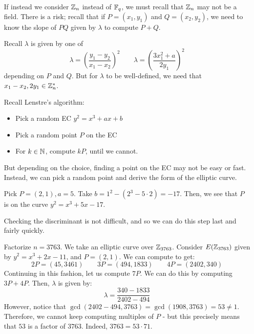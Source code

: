 \documentclass{article}
\begin{document}
If instead we consider $ \mathbb{Z}_{n} $ instead of $ \mathbb{F}_{q} $,
we must recall that $ \mathbb{Z}_{n} $ may not be a field.
There is a risk; recall that if $ P = (x_{1}, y_{1}) $ and $ Q = (x_{2}, y_{2}) $,
we need to know the slope of $ PQ $ given by $ \lambda $ to compute $ P + Q $.

Recall $ \lambda $ is given by one of
\begin{equation*}
    \lambda = \left( \frac{y_{1} - y_{2}}{x_{1} - x_{2}} \right)^{2} \qquad
    \lambda = \left( \frac{3x_{1}^{2}+a}{2y_{1}} \right)^{2}
\end{equation*}
depending on $ P $ and $ Q $.
But for $ \lambda $ to be well-defined, we need that $ x_{1} - x_{2}, 2y_{1} \in \mathbb{Z}_{n}^{*} $.

\newpage
Recall Lenstre's algorithm:
\begin{itemize}
    \item Pick a random EC $ y^{2} = x^{3} + ax + b $
    \item Pick a random point $ P $ on the EC
    \item For $ k \in \mathbb{N} $, compute $ kP $, until we cannot.
\end{itemize}
But depending on the choice, finding a point on the EC may not be easy or fast.
Instead, we can pick a random point and derive the form of the elliptic curve.
\begin{xmp}[source=Primary Source Material]
    Pick $ P = (2, 1), a = 5 $.
    Take $ b = 1^{2} - (2^{3} - 5\cdot2) = -17 $.
    Then, we see that $ P $ is on the curve $ y^{2} = x^{3} + 5x - 17 $.
\end{xmp}
Checking the discriminant is not difficult, and so we can do this step last and fairly quickly.

\begin{xmp}[source=Primary Source Material]
    Factorize $ n = 3763 $. \vsp
    We take an elliptic curve over $ \mathbb{Z}_{3763} $.
    Consider $ E(\mathbb{Z}_{3763}) $ given by $ y^{2} = x^{3} + 2x - 11 $, and $ P = (2, 1) $.
    We can compute to get:
    \begin{equation*}
        2P = (45, 3461) \qquad 3P = (494, 1833) \qquad 4P = (2402, 340)
    \end{equation*}
    Continuing in this fashion, let us compute $ 7P $. We can do this by computing $ 3P + 4P $.
    Then, $ \lambda $ is given by:
    \begin{equation*}
        \lambda = \frac{340 - 1833}{2402 - 494}
    \end{equation*}
    However, notice that $ \gcd(2402 - 494, 3763) = \gcd(1908, 3763) = 53 \neq 1 $. \vsp
    Therefore, we cannot keep computing multiples of $ P $ - but this precisely means that $ 53 $
    is a factor of $ 3763 $. Indeed, $ 3763 = 53 \cdot 71 $.
\end{xmp}
\end{document}
